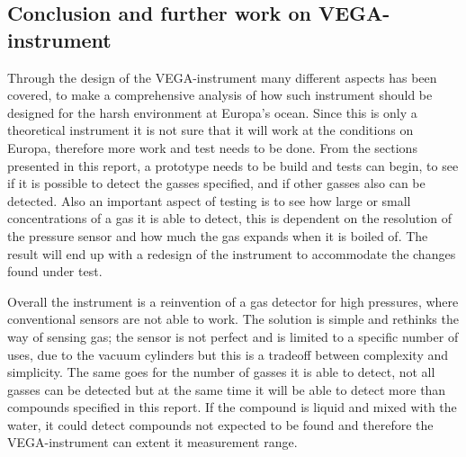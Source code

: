 \documentclass[10pt,a4paper,draft]{report}
\begin{document}
\subsection{Conclusion and further work on VEGA-instrument}
Through the design of the VEGA-instrument many different aspects has been covered, to make a comprehensive analysis of how such instrument should be designed for the harsh environment at Europa’s ocean. Since this is only a theoretical instrument it is not sure that it will work at the conditions on Europa, therefore more work and test needs to be done. From the sections presented in this report, a prototype needs to be build and tests can begin, to see if it is possible to detect the gasses specified, and if other gasses also can be detected. Also an important aspect of testing is to see how large or small concentrations of a gas it is able to detect, this is dependent on the resolution of the pressure sensor and how much the gas expands when it is boiled of. The result will end up with a redesign of the instrument to accommodate the changes found under test.\par
Overall the instrument is a reinvention of a gas detector for high pressures, where conventional sensors are not able to work. The solution is simple and rethinks the way of sensing gas; the sensor is not perfect and is limited to a specific number of uses, due to the vacuum cylinders but this is a tradeoff between complexity and simplicity. The same goes for the number of gasses it is able to detect, not all gasses can be detected but at the same time it will be able to detect more than compounds specified in this report. If the compound is liquid and mixed with the water, it could detect compounds not expected to be found and therefore the VEGA-instrument can extent it measurement range.\par
\end{document}
